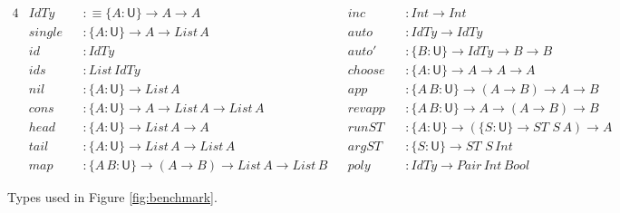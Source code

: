 \documentclass[acmsmall,screen,dvipsnames]{acmart}\settopmatter{}
\renewcommand{\U}{\mathsf{U}}
\newcommand{\mi}[1]{\mathit{#1}}
\theoremstyle{remark}
\begin{document}
{\small

\begin{figure}
\begin{alignat*}{4}
  & \mi{IdTy}   && :\equiv \{A : \U\}\to A \to A   \hspace{10em}         && \mi{inc}    && : \mi{Int} \to \mi{Int}                                        \\
  & \mi{single} && : \{A : \U\} \to A \to \mi{List}\,A                        && \mi{auto}   && : IdTy \to IdTy                                      \\
  & \mi{id}     && : IdTy                                                && \mi{auto'}  && : \{B : \U\}\to IdTy \to B \to B                     \\
  & \mi{ids}    && : \mi{List}\,IdTy                                          && \mi{choose} && : \{A : \U\} \to A \to A \to A                       \\
  & \mi{nil}    && : \{A : \U\}\to \mi{List}\,A                               && \mi{app}    && : \{A\,B : \U\} \to (A \to B) \to A \to B            \\
  & \mi{cons}   && : \{A : \U\} \to A \to \mi{List}\,A \to \mi{List}\,A            && \mi{revapp} && : \{A\,B : \U\} \to A \to (A \to B) \to B            \\
  & \mi{head}   && : \{A : \U\} \to \mi{List}\,A \to A                        && \mi{runST}  && : \{A : \U\} \to (\{S : \U\} \to \mi{ST}\,\,S\,A) \to A     \\
  & \mi{tail}   && : \{A : \U\} \to \mi{List}\,A \to \mi{List}\,A                  && \mi{argST}  && : \{S : \U\}\to \mi{ST}\,\,S\,\mi{Int}                           \\
  & \mi{map}    && : \{A\,B : \U\} \to (A \to B) \to \mi{List}\,A \to \mi{List}\,B && \mi{poly}   && : IdTy \to \mi{Pair}\,\mi{Int}\,\mi{Bool}
\end{alignat*}
\caption{Types used in Figure \ref{fig:benchmark}.}
\label{fig:benchmark_types}
\end{figure}

}
\end{document}
